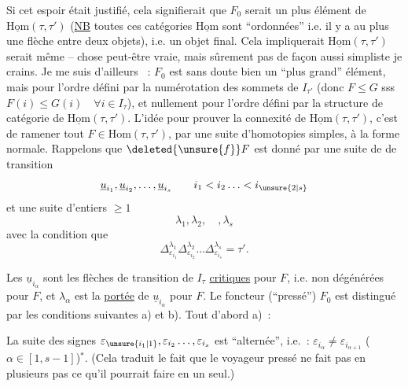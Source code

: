 Si  cet espoir était justifié, cela signifierait que $F_0$ serait un plus   élément de $\underline{\mathrm{Hom}}(\tau,\tau')$ (\uline{NB} toutes ces catégories $\underline{\mathrm{Hom}}$  sont ``ordonnées'' i.e. il y a au plus une flèche entre deux objets), i.e. un objet  final. Cela impliquerait  $\underline{\mathrm{Hom}}(\tau,\tau')$ serait même  -- chose peut-être vraie, mais sûrement pas de façon aussi simpliste je crains. Je me suis d'ailleurs ~:
$F_0$ est  sans doute bien un ``plus grand''  élément, mais pour l'ordre défini par la numérotation des sommets de $I_{\tau'}$ (donc $F\leq G$ sss $F(i)\leq G(i)\quad\forall i\in I_\tau$), et nullement pour l'ordre défini par la structure de catégorie de $\underline{\mathrm{Hom}}(\tau,\tau')$.
L'idée pour prouver la connexité de $\underline{\mathrm{Hom}}(\tau,\tau')$, c'est de ramener tout $F\in\mathrm{Hom}(\tau,\tau')$, par une suite d'homotopies simples, à la forme normale. Rappelons que $\deleted{\unsure{f}}F$ est donné par une suite  de   de transition
\[
\underline{u}_{i_1},\underline{u}_{i_2},\ldots,\underline{u}_{i_s}\qquad i_1<i_2\ldots<i_{\unsure{2|s}}
\]
et une suite d'entiers $\geq1$
\[
\lambda_1,\lambda_2,\quad,\lambda_s
\]
avec la condition que
\[
\Delta_{\varepsilon_{i_1}}^{\lambda_1}\Delta_{\varepsilon_{i_2}}^{\lambda_2}\ldots
\Delta_{\varepsilon_{i_s}}^{\lambda_s}=\tau'.\tag*{$(*)$}
\]

Les $\underline{u}_{i_\alpha}$ sont les flèches de transition de $I_\tau$ \uline{critiques} pour $F$, i.e. non dégénérées pour $F$,  et $\lambda_\alpha$ est la \uline{portée} de $\underline{u}_{i_\alpha}$ pour $F$. Le  foncteur  (``pressé'') $F_0$ est distingué par les conditions suivantes a) et b). Tout d'abord a)~:

 La suite des signes $\varepsilon_{\unsure{i_1|1}},\varepsilon_{i_2}\ldots,\varepsilon_{i_s}$ est ``alternée'', \unsure{(}i.e.~: $\varepsilon_{i_\alpha}\ne\varepsilon_{i_{\alpha+1}}$ ($\alpha\in[1,s-1]$)$^*$. (Cela traduit le fait que le voyageur pressé ne fait pas en plusieurs pas ce qu'il pourrait faire en un seul.)

